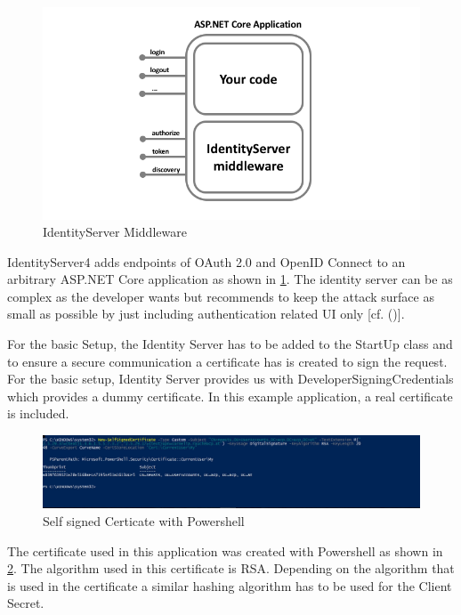 \begin{figure}[h]
	\centering
	\includegraphics[width=0.7\linewidth]{images/middlewareIdentityServer}
	\caption{IdentityServer Middleware}
	\label{fig:middlewareidentityserver}
\end{figure}
 

IdentityServer4 adds endpoints of OAuth 2.0 and OpenID Connect to an arbitrary ASP.NET Core application as shown in \ref{fig:middlewareidentityserver}. The identity server can be as complex as the developer wants but \cite{Brock:2018:ID4} recommends to keep the attack surface as small as possible by just including authentication related UI only [cf. (\cite{Brock:2018:ID4})]. 


For the basic Setup, the Identity Server has to be added to the StartUp class and to ensure a secure communication a certificate has is created to sign the request. For the basic setup, Identity Server provides us with DeveloperSigningCredentials which provides a dummy certificate. In this example application, a real certificate is included. 

\begin{figure}[h]
	\centering
	\includegraphics[width=0.8\linewidth]{images/self-signed-certicate}
	\caption{Self signed Certicate with Powershell}
	\label{fig:self-signed-certicate}
\end{figure}

The certificate used in this application was created with Powershell as shown in \ref{fig:self-signed-certicate}. The algorithm used in this certificate is RSA. Depending on the algorithm that is used in the certificate a similar hashing algorithm has to be used for the Client Secret.


